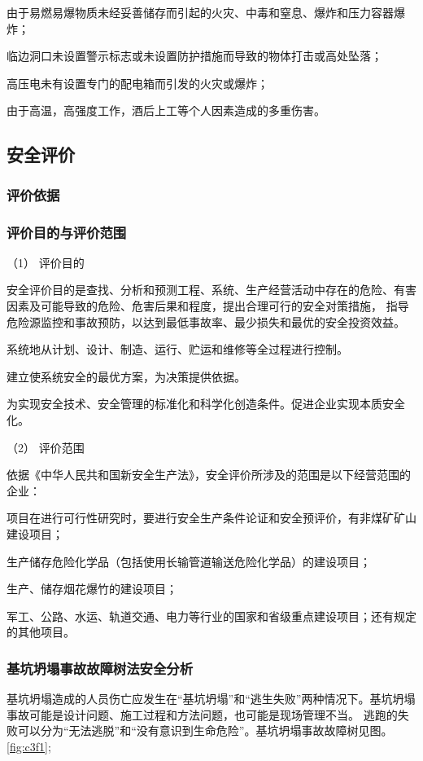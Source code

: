  由于易燃易爆物质未经妥善储存而引起的火灾、中毒和窒息、爆炸和压力容器爆炸；

 临边洞口未设置警示标志或未设置防护措施而导致的物体打击或高处坠落；

 高压电未有设置专门的配电箱而引发的火灾或爆炸；

 由于高温，高强度工作，酒后上工等个人因素造成的多重伤害。

\subsection{安全评价}
\subsubsection{评价依据}
\subsubsection{评价目的与评价范围}

（1） 评价目的

安全评价目的是查找、分析和预测工程、系统、生产经营活动中存在的危险、有害因素及可能导致的危险、危害后果和程度，提出合理可行的安全对策措施，
指导危险源监控和事故预防，以达到最低事故率、最少损失和最优的安全投资效益。

 系统地从计划、设计、制造、运行、贮运和维修等全过程进行控制。

  建立使系统安全的最优方案，为决策提供依据。

 为实现安全技术、安全管理的标准化和科学化创造条件。促进企业实现本质安全化。

（2） 评价范围

依据《中华人民共和国新安全生产法》，安全评价所涉及的范围是以下经营范围的企业：

 项目在进行可行性研究时，要进行安全生产条件论证和安全预评价，有非煤矿矿山建设项目；

 生产储存危险化学品（包括使用长输管道输送危险化学品）的建设项目；

 生产、储存烟花爆竹的建设项目；

 军工、公路、水运、轨道交通、电力等行业的国家和省级重点建设项目；还有规定的其他项目。

\subsubsection{基坑坍塌事故故障树法安全分析}

基坑坍塌造成的人员伤亡应发生在“基坑坍塌”和“逃生失败”两种情况下。基坑坍塌事故可能是设计问题、施工过程和方法问题，也可能是现场管理不当。
逃跑的失败可以分为“无法逃脱”和“没有意识到生命危险”。基坑坍塌事故故障树见图。\ref{fig:c3f1};

